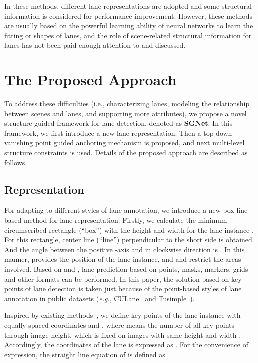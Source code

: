 \documentclass{article}
\def\eg{\emph{e.g.}}
\begin{document}
In these methods, different lane representations are adopted and some structural information is considered for performance improvement. However, these methods are usually based on the powerful learning ability of neural networks to learn the fitting or shapes of lanes, and the role of scene-related structural information for lanes has not been paid enough attention to and discussed.

\section{The Proposed Approach}
To address these difficulties (i.e., characterizing lanes, modeling the relationship between scenes and lanes, and supporting more attributes), we propose a novel structure guided framework for lane detection, denoted as \textbf{SGNet}. In this framework, we first introduce a new lane representation. Then a top-down vanishing point guided anchoring mechanism is proposed, and next multi-level structure constraints is used. Details of the proposed approach are described as follows.

\subsection{Representation}
For adapting to different styles of lane annotation, we introduce a new box-line based method for lane representation. Firstly, we calculate the minimum circumscribed rectangle  (``box'') with the height  and width  for the lane instance . For this rectangle, center line  (``line'') perpendicular to the short side is obtained. And the angle between the positive -axis and  in clockwise direction is . In this manner,  provides the position of the lane instance, and  and  restrict the areas involved. Based on  and  , lane prediction based on points, masks, markers, grids and other formats can be performed. In this paper, the solution based on key points of lane detection is taken just because of the point-based styles of lane annotation in public datasets (\eg, CULane~\cite{tusimple} and Tusimple~\cite{pan2018spatial}).

Inspired by existing methods~\cite{li2019line,chen2019pointlanenet,qin2020ultra}, we define key points of the lane instance with equally spaced  coordinates  and , where  means the number of all key points through image height, which is fixed on images with same height  and width . Accordingly, the  coordinates of the lane is expressed as . For the convenience of expression, the straight line equation of  is defined as 
\end{document}
